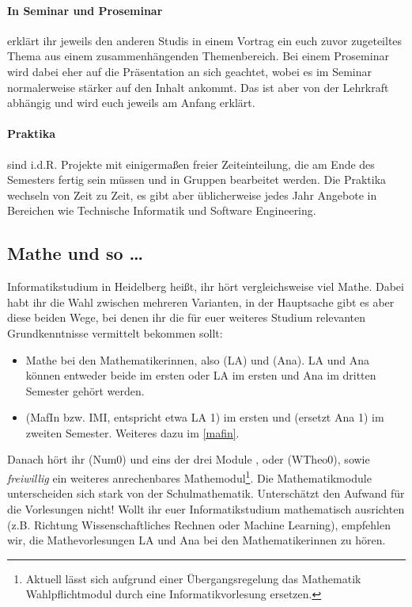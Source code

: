 \paragraph*{In Seminar und Proseminar} erklärt ihr jeweils den anderen Studis in einem Vortrag ein euch zuvor zugeteiltes Thema aus einem zusammenhängenden Themenbereich. Bei einem Proseminar wird dabei eher auf die Präsentation an sich geachtet, wobei es im Seminar normalerweise stärker auf den Inhalt ankommt. Das ist aber von der Lehrkraft abhängig und wird euch jeweils am Anfang erklärt.

\paragraph*{Praktika} sind i.d.R. Projekte mit einigermaßen freier Zeiteinteilung, die am Ende des Semesters fertig sein müssen und in Gruppen bearbeitet werden. Die Praktika wechseln von Zeit zu Zeit, es gibt aber üblicherweise jedes Jahr Angebote in Bereichen wie Technische Informatik und Software Engineering.

\subsection{Mathe und so \dots}

Informatikstudium in Heidelberg heißt, ihr hört vergleichsweise viel Mathe. Dabei habt ihr die Wahl zwischen mehreren Varianten, in der Hauptsache gibt es aber diese beiden Wege, bei denen ihr die für euer weiteres Studium relevanten Grundkenntnisse vermittelt bekommen sollt:

\begin{itemize}
	\item Mathe bei den Mathematikerinnen, also  (\gls{LA}) und  (\gls{Ana}). \gls{LA} und \gls{Ana} können entweder beide im ersten oder \gls{LA} im ersten und \gls{Ana} im dritten Semester gehört werden.
	\item {} (\gls{MafIn} bzw. IMI, entspricht etwa \gls{LA} 1) im ersten und  (ersetzt \gls{Ana} 1) im zweiten Semester. Weiteres dazu im \autoref{mafin}.
\end{itemize}

Danach hört ihr  (\gls{Num0}) und eins der drei Module ,  oder  (\gls{WTheo0}), sowie \emph{freiwillig} ein weiteres anrechenbares Mathemodul\footnote{Aktuell lässt sich aufgrund einer Übergangsregelung das Mathematik Wahlpflichtmodul durch eine Informatikvorlesung ersetzen.}. Die Mathematikmodule unterscheiden sich stark von der Schulmathematik. Unterschätzt den Aufwand für die Vorlesungen nicht! Wollt ihr euer Informatikstudium mathematisch ausrichten (z.B. Richtung Wissenschaftliches Rechnen oder Machine Learning), empfehlen wir, die Mathevorlesungen \gls{LA} und \gls{Ana} bei den Mathematikerinnen zu hören.

